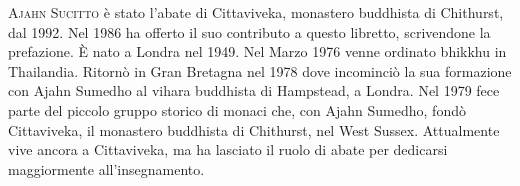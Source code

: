 {{\scshape Ajahn Sucitto} è stato l'abate di Cittaviveka, monastero buddhista di Chithurst, dal 1992. Nel 1986 ha offerto il suo contributo a questo libretto, scrivendone la prefazione. È nato a Londra nel 1949. Nel Marzo 1976 venne ordinato bhikkhu in Thailandia. Ritornò in Gran Bretagna nel 1978 dove incominciò la sua formazione con Ajahn Sumedho al vihara buddhista di Hampstead, a Londra. Nel 1979 fece parte del piccolo gruppo storico di monaci che, con Ajahn Sumedho, fondò Cittaviveka, il monastero buddhista di Chithurst, nel West Sussex. Attualmente vive ancora a Cittaviveka, ma ha lasciato il ruolo di abate per dedicarsi maggiormente all'insegnamento.

}

